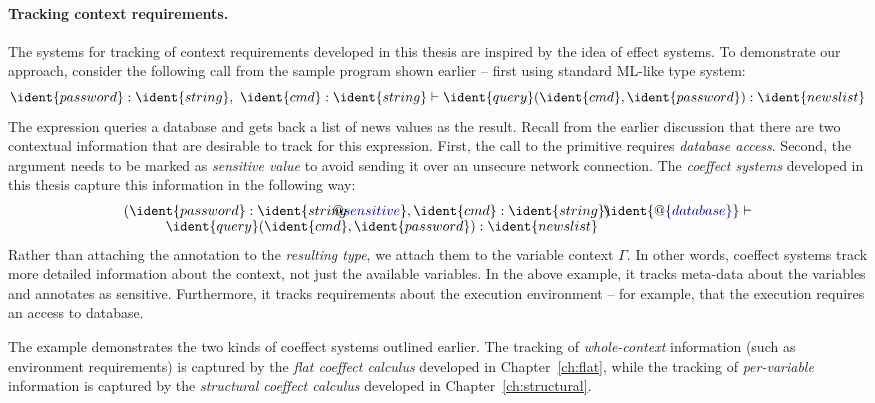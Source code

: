 \paragraph{Tracking context requirements.}

The systems for tracking of context requirements developed in this thesis are inspired by the idea
of effect systems. To demonstrate our approach, consider the following call from the sample program
shown earlier -- first using standard ML-like type system:
%
\begin{equation*}
\ident{password}\-:\-\ident{string},~\ident{cmd}\-:\-\ident{string} 
  \vdash \ident{query}(\ident{cmd}, \ident{password}) : \ident{news list}
\end{equation*}
%
The expression queries a database and gets back a list of news values as the result. Recall from the
earlier discussion that there are two contextual information that are desirable to track for this 
expression. First, the call to the  primitive requires \emph{database access}. Second,
the  argument needs to be marked as \emph{sensitive value} to avoid sending it over
an unsecure network connection.
The \emph{coeffect systems} developed in this thesis capture this information in the following way: 
%
\begin{equation*}
\begin{array}{l}
 ( \ident{password}\-:\-\ident{string \hspace{-1em}{\footnotesize @ \aclrd{sensitive}}},
   \ident{cmd}\-:\-\ident{string})
 \hspace{-0.5em}
 \ident{\footnotesize @ \aclrd{\{ database \}}} \vdash \\[-0.1em]
 \hspace{3em} \ident{query}(\ident{cmd}, \ident{password}) : \ident{news list}
\end{array}
\end{equation*}
%
Rather than attaching the annotation to the \emph{resulting type}, we attach them to the variable
context $\Gamma$. In other words, coeffect systems track more detailed information about the context,
not just the available variables. In the above example, it tracks meta-data about the variables
and annotates  as sensitive. Furthermore, it tracks requirements about the execution
environment -- for example, that the execution requires an access to database.

The example demonstrates the two kinds of coeffect systems outlined earlier. The tracking of 
\emph{whole-context} information (such as environment requirements) is captured by the \emph{flat 
coeffect calculus} developed in Chapter~\ref{ch:flat}, while the tracking of \emph{per-variable} 
information is captured by the \emph{structural coeffect calculus} developed in Chapter~\ref{ch:structural}.

